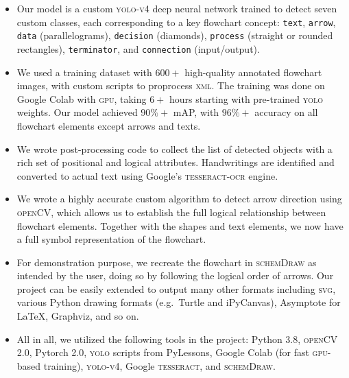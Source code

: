 \documentclass[10pt]{article}
\begin{document}
\begin{itemize}

\item Our model is a custom \textsc{yolo-v4} deep neural network
trained to detect seven custom classes, each corresponding to
a key flowchart concept: \texttt{text}, \texttt{arrow},
\texttt{data} (parallelograms), \texttt{decision} (diamonds), \texttt{process} (straight
or rounded rectangles), \texttt{terminator}, and \texttt{connection} (input/output).

\item We used a training dataset with $600+$ high-quality annotated flowchart
images, with custom scripts to proprocess \textsc{xml}.
The training was done on Google Colab with \textsc{gpu}, taking $6+$ hours
starting with pre-trained \textsc{yolo} weights.
Our model achieved $90\%+$ mAP, with $96\%+$ accuracy on
all flowchart elements except arrows and texts.

\item We wrote post-processing code to collect the list of detected objects with a
rich set of positional and logical attributes.
Handwritings are identified and converted to actual text using
Google's \textsc{tesseract-ocr} engine.

\item We wrote a highly accurate custom algorithm to detect arrow direction
using \textsc{openCV}, which allows us to establish the full logical relationship
between flowchart elements. Together with the shapes and text elements, we now
have a full symbol representation of the flowchart.

\item For demonstration purpose,
we recreate the flowchart in \textsc{schemDraw} as intended by
the user, doing so by following the logical order of arrows.
Our project can be easily extended to
output many other formats including \textsc{svg}, various Python drawing
formats (e.g.~Turtle and iPyCanvas), Asymptote for \LaTeX, Graphviz, and so on.

\item All in all, we utilized the following tools in the project: Python 3.8,
\textsc{openCV} 2.0, Pytorch 2.0, \textsc{yolo} scripts from PyLessons,
Google Colab (for fast \textsc{gpu}-based training),
\textsc{yolo-v4}, Google \textsc{tesseract}, and
\textsc{schemDraw}.
\end{itemize}

\end{document}
